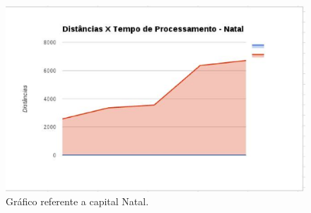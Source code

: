 \begin{figure}[!htb]
 \centering
 \includegraphics[scale= 0.3]{figuras/imagem4.eps}
 \caption{Gráfico referente a capital Natal.}
\end{figure}